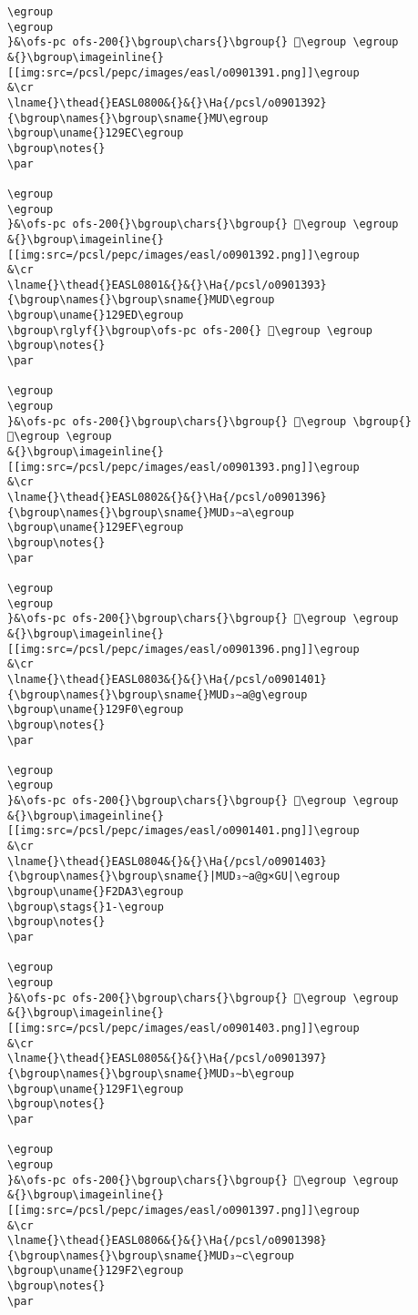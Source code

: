 \begin{verbatim}
\egroup
\egroup
}&\ofs-pc ofs-200{}\bgroup\chars{}\bgroup{} 𒧫\egroup \egroup
&{}\bgroup\imageinline{}[[img:src=/pcsl/pepc/images/easl/o0901391.png]]\egroup
&\cr
\lname{}\thead{}EASL0800&{}&{}\Ha{/pcsl/o0901392}{\bgroup\names{}\bgroup\sname{}MU\egroup
\bgroup\uname{}129EC\egroup
\bgroup\notes{}
\par 

\egroup
\egroup
}&\ofs-pc ofs-200{}\bgroup\chars{}\bgroup{} 𒧬\egroup \egroup
&{}\bgroup\imageinline{}[[img:src=/pcsl/pepc/images/easl/o0901392.png]]\egroup
&\cr
\lname{}\thead{}EASL0801&{}&{}\Ha{/pcsl/o0901393}{\bgroup\names{}\bgroup\sname{}MUD\egroup
\bgroup\uname{}129ED\egroup
\bgroup\rglyf{}\bgroup\ofs-pc ofs-200{} 𒧭\egroup \egroup
\bgroup\notes{}
\par 

\egroup
\egroup
}&\ofs-pc ofs-200{}\bgroup\chars{}\bgroup{} 𒧭\egroup \bgroup{} 𒧮\egroup \egroup
&{}\bgroup\imageinline{}[[img:src=/pcsl/pepc/images/easl/o0901393.png]]\egroup
&\cr
\lname{}\thead{}EASL0802&{}&{}\Ha{/pcsl/o0901396}{\bgroup\names{}\bgroup\sname{}MUD₃∼a\egroup
\bgroup\uname{}129EF\egroup
\bgroup\notes{}
\par 

\egroup
\egroup
}&\ofs-pc ofs-200{}\bgroup\chars{}\bgroup{} 𒧯\egroup \egroup
&{}\bgroup\imageinline{}[[img:src=/pcsl/pepc/images/easl/o0901396.png]]\egroup
&\cr
\lname{}\thead{}EASL0803&{}&{}\Ha{/pcsl/o0901401}{\bgroup\names{}\bgroup\sname{}MUD₃∼a@g\egroup
\bgroup\uname{}129F0\egroup
\bgroup\notes{}
\par 

\egroup
\egroup
}&\ofs-pc ofs-200{}\bgroup\chars{}\bgroup{} 𒧰\egroup \egroup
&{}\bgroup\imageinline{}[[img:src=/pcsl/pepc/images/easl/o0901401.png]]\egroup
&\cr
\lname{}\thead{}EASL0804&{}&{}\Ha{/pcsl/o0901403}{\bgroup\names{}\bgroup\sname{}|MUD₃∼a@g×GU|\egroup
\bgroup\uname{}F2DA3\egroup
\bgroup\stags{}1-\egroup
\bgroup\notes{}
\par 

\egroup
\egroup
}&\ofs-pc ofs-200{}\bgroup\chars{}\bgroup{} 󲶣\egroup \egroup
&{}\bgroup\imageinline{}[[img:src=/pcsl/pepc/images/easl/o0901403.png]]\egroup
&\cr
\lname{}\thead{}EASL0805&{}&{}\Ha{/pcsl/o0901397}{\bgroup\names{}\bgroup\sname{}MUD₃∼b\egroup
\bgroup\uname{}129F1\egroup
\bgroup\notes{}
\par 

\egroup
\egroup
}&\ofs-pc ofs-200{}\bgroup\chars{}\bgroup{} 𒧱\egroup \egroup
&{}\bgroup\imageinline{}[[img:src=/pcsl/pepc/images/easl/o0901397.png]]\egroup
&\cr
\lname{}\thead{}EASL0806&{}&{}\Ha{/pcsl/o0901398}{\bgroup\names{}\bgroup\sname{}MUD₃∼c\egroup
\bgroup\uname{}129F2\egroup
\bgroup\notes{}
\par 


\end{verbatim}
